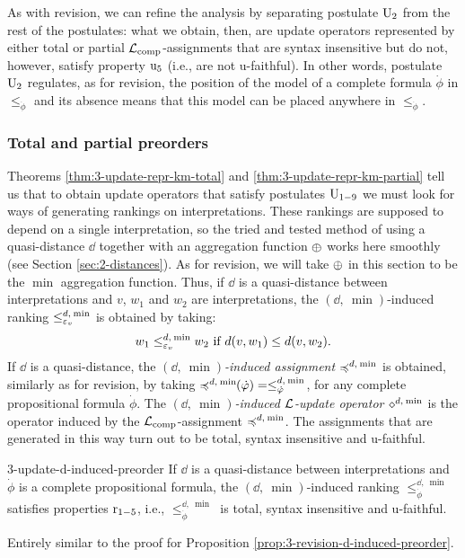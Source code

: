 As with revision, we can refine the analysis 
by separating postulate $\mathrm{U}_{2}$ from the rest of the postulates:
what we obtain, then, are update operators represented
by either total or partial $\mathcal{L}_{{\operatorname{comp}}}$-assignments that are syntax insensitive
but do not, however, satisfy property $\mathrm{u}_{5}$ (i.e., are not u-faithful).
In other words, postulate $\mathrm{U}_{2}$ regulates, as for revision,
the position of the model of a complete formula $\dot{\phi}$
in $\le_{\dot{\phi}}$ and its absence means that this model can
be placed anywhere in $\le_{\dot{\phi}}$.

\subsubsection{Total and partial preorders}
Theorems \ref{thm:3-update-repr-km-total} and \ref{thm:3-update-repr-km-partial}
tell us that to obtain update operators that satisfy postulates $\mathrm{U}_{1-9}$
we must look for ways of generating rankings on interpretations.
These rankings are supposed to depend on a single interpretation,
so the tried and tested method of using a quasi-distance $\dd$ 
together with an aggregation function ${\operatorname{\oplus}}$
works here smoothly (see Section \ref{sec:2-distances}). 
As for revision, we will take ${\operatorname{\oplus}}$ in this section 
to be the $\min$ aggregation function.
Thus, if $\dd$ is a quasi-distance between interpretations
and $v$, $w_1$ and $w_2$ are interpretations, the
$(\dd,\:\min)$-induced ranking $\le^{d,\:{\operatorname{min}}}_{\varepsilon_{v}}$
is obtained by taking:
$$
	w_1\le^{d,\:{\operatorname{min}}}_{\varepsilon_{v}} w_2~\text{if}~d(v,w_1)\le d(v,w_2).
$$
If $\dd$ is a quasi-distance,
the \emph{${(\dd,\:\min)}$-induced assignment $\preccurlyeq^{d,\:{\operatorname{min}}}$} is obtained,
similarly as for revision, by taking 
$\preccurlyeq^{d,\:{\operatorname{min}}}\!\!(\dot{\varphi})=\le_{\dot{\varphi}}^{d,\:{\operatorname{min}}}$,
for any complete propositional formula $\dot{\phi}$.
The \emph{${(\dd,\:\min)}$-induced $\mathcal{L}$-update operator $\diamond^{d,\:{\operatorname{min}}}$} 
is the operator induced by the $\mathcal{L}_{{\operatorname{comp}}}$-assignment $\preccurlyeq^{d,\:{\operatorname{min}}}$.
The assignments that are generated in this way turn out to be 
total, syntax insensitive and u-faithful.

\begin{prp}{}{3-update-d-induced-preorder}
	If $\dd$ is a quasi-distance between interpretations 
	and $\dot{\phi}$ is a complete propositional formula, 
	the ${(\dd,\:\min)}$-induced ranking $\le^{\dd,\:\min}_{\dot{\phi}}$ 
	satisfies properties $\mathrm{r}_{1-5}$, 
	i.e., $\le^{\dd,\:\min}_{\dot{\phi}}$ is total,
	syntax insensitive and u-faithful.
\end{prp}
\begin{prf*}{}{}%
	Entirely similar to the proof for Proposition \ref{prop:3-revision-d-induced-preorder}.
\end{prf*}

